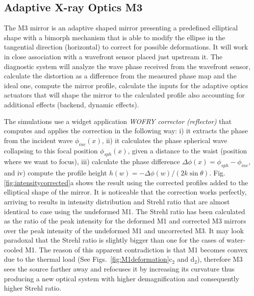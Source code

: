 \documentclass{iucr}              %
\begin{document}
\subsection{Adaptive X-ray Optics M3}

The M3 mirror is an adaptive shaped mirror presenting a predefined elliptical shape with a bimorph mechanism that is able to modify the ellipse in the tangential direction (horizontal) to correct for possible deformations. It will work in close association with a wavefront sensor placed just upstream it. The diagnostic system will analyze the wave phase received from the wavefront sensor, calculate the distortion as a difference from the measured phase map and the ideal one, compute the mirror profile, calculate the inputs for the adaptive optics actuators that will shape the mirror to the calculated profile also accounting for additional effects (backend, dynamic effects).

The simulations use a widget application {\it WOFRY corrector (reflector)} that computes and applies the correction in the following way: i) it extracts the phase from the incident wave $\phi_{inc}(x)$, ii)  it calculates the phase spherical wave collapsing to this focal position $\phi_{sph}(x)$, given a distance to the waist (position where we want to focus), iii) calculate the phase difference $\Delta \phi(x) = \phi_{sph} - \phi_{inc}$, and iv) compute the profile height $h(w) = -\Delta \phi(w) / (2 k \sin \theta)$. Fig.\ref{fig:intensitycorrected}a shows the result using the corrected profiles added to the elliptical shape of the mirror. It is noticeable that the correction works perfectly, arriving to results in intensity distribution and Strehl ratio that are almost identical to case using the undeformed M1. The Strehl ratio has been calculated as the ratio of the peak intensity for the deformed M1 and corrected M3 mirrors over the peak intensity of the undeformed M1 and uncorrected M3. It may look paradoxal that the Strehl ratio is slightly bigger than one for the cases of water-cooled M1. The reason of this apparent contradiction is that M1 becomes convex due to the thermal load (See Figs.~\ref{fig:M1deformation}c$_2$ and d$_2$), therefore M3 sees the source farther away and refocuses it by increasing its curvature thus producing a new optical system with higher demagnification and consequently higher Strehl ratio.   
\end{document}
